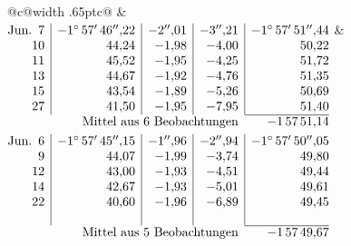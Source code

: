 \noindent\begin{tabular}{@{}c@{\hspace{.4em}\vrule width .65pt\hspace{.4em}}c@{}}
 &
 \\[.18ex]
\(\begin{array}[t]{@{}r|r|r|r|r@{}}
\text{Jun.}\enspace 7 & -1^\circ\,57'\,46''{,}22 & -2''{,}01 & -3''{,}21 & -1^\circ\,57'\,51''{,}44\\
10 & 44{,}24 & -1{,}98 & -4{,}00 & 50{,}22\\
11 & 45{,}52 & -1{,}95 & -4{,}25 & 51{,}72\\
13 & 44{,}67 & -1{,}92 & -4{,}76 & 51{,}35\\
15 & 43{,}54 & -1{,}89 & -5{,}26 & 50{,}69\\
27 & 41{,}50 & -1{,}95 & -7{,}95 & 51{,}40\\
\cline{5-5}
\multicolumn{4}{r}{\text{Mittel aus 6 Beobachtungen}} & -1\,57\,51{,}14
\end{array}\)
&
\(\begin{array}[t]{@{}r|r|r|r|r@{}}
\text{Jun.}\enspace 6 & -1^\circ\,57'\,45''{,}15 & -1''{,}96 & -2''{,}94 & -1^\circ\,57'\,50''{,}05\\
9 & 44{,}07 & -1{,}99 & -3{,}74 & 49{,}80\\
12 & 43{,}00 & -1{,}93 & -4{,}51 & 49{,}44\\
14 & 42{,}67 & -1{,}93 & -5{,}01 & 49{,}61\\
22 & 40{,}60 & -1{,}96 & -6{,}89 & 49{,}45\\
 & & & & \\
\cline{5-5}
\multicolumn{4}{r}{\text{Mittel aus 5 Beobachtungen}} & -1\,57\,49{,}67
\end{array}\)
\end{tabular}\par\medskip
{}
